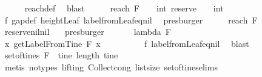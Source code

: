 \begin{isabellebody}
\ \ \ \ \isamarkupfalse%
\ reach{\isacharunderscore}def\ \isamarkupfalse%
\ blast\isanewline
\ \ \isamarkupfalse%
\ \isamarkupfalse%
\ {\isachardoublequoteopen}reach\ F\ {\isacharbrackleft}{\isacharbrackright}\ {\isacharbrackleft}{\isacharbrackright}\ {\isacharequal}\ int\ {\isacharparenleft}reserve\ {\isacharbrackleft}{\isacharbrackright}\ {\isacharbrackleft}{\isacharbrackright}{\isacharparenright}\ {\isacharminus}\ int\ {}{\isachardoublequoteclose}\isanewline
\ \ \ \ \isamarkupfalse%
\ f{}\ gap{\isacharunderscore}def\ height{\isacharunderscore}Leaf\ label{\isacharunderscore}from{\isacharunderscore}Leaf{\isacharunderscore}eq{\isacharunderscore}nil\ \isamarkupfalse%
\ presburger\isanewline
\ \ \isamarkupfalse%
\ \isamarkupfalse%
\ {\isachardoublequoteopen}reach\ F\ {\isacharbrackleft}{\isacharbrackright}\ {\isacharbrackleft}{\isacharbrackright}\ {\isacharequal}\ {}{\isachardoublequoteclose}\isanewline
\ \ \ \ \isamarkupfalse%
\ reserve{\isacharunderscore}nil{\isacharunderscore}nil\ \ \isamarkupfalse%
\ presburger\ \isanewline
\ \ \isamarkupfalse%
\ \isamarkupfalse%
\ {\isachardoublequoteopen}lambda\ F\ {\isacharbrackleft}{\isacharbrackright}\ {\isacharequal}\ {}{\isachardoublequoteclose}\isanewline
\ \ \isamarkupfalse%
\ {\isacharminus}\ \isanewline
\ \ \ \ \isamarkupfalse%
\ {\isachardoublequoteopen}{\isasymforall}x{\isachardot}\ getLabelFromTine\ F\ x\ {\isacharequal}\ {\isacharbrackleft}{\isacharbrackright}{\isachardoublequoteclose}\isanewline
\ \ \ \ \ \ \isamarkupfalse%
\ f{}\ label{\isacharunderscore}from{\isacharunderscore}Leaf{\isacharunderscore}eq{\isacharunderscore}nil\ \isamarkupfalse%
\ blast\isanewline
\ \ \ \ \isamarkupfalse%
\ \isamarkupfalse%
\ {\isachardoublequoteopen}set{\isacharunderscore}of{\isacharunderscore}tines\ F\ {\isacharequal}\ {\isacharbraceleft}tine{\isachardot}\ length\ tine\ {\isacharequal}\ {}{\isacharbraceright}{\isachardoublequoteclose}\isanewline
\ \ \ \ \ \ \isamarkupfalse%
\ {\isacharparenleft}metis\ {\isacharparenleft}no{\isacharunderscore}types{\isacharcomma}\ lifting{\isacharparenright}\ Collect{\isacharunderscore}cong\ list{\isachardot}size{\isacharparenleft}{}{\isacharparenright}\ set{\isacharunderscore}of{\isacharunderscore}tines{\isachardot}elims{\isacharparenright}\isanewline

\end{isabellebody}
